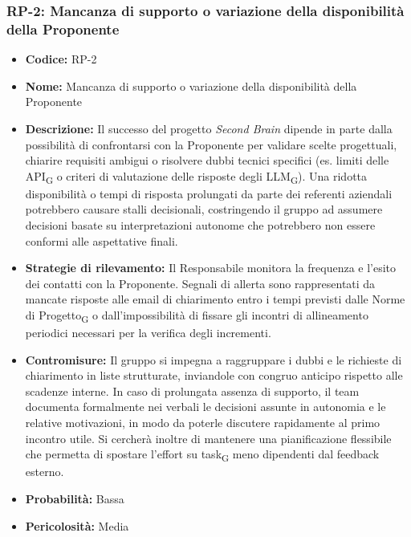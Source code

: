 \documentclass[a4paper, 10pt, colorlinks=true, linkcolor=black, urlcolor=blue, citecolor=blue, hidelinks]{article}
\begin{document}
\subsubsection{RP-2: Mancanza di supporto o variazione della disponibilità della Proponente}
\begin{itemize}
    \item \textbf{Codice:} RP-2
    \item \textbf{Nome:} Mancanza di supporto o variazione della disponibilità della Proponente

    \item \textbf{Descrizione:} Il successo del progetto \textit{Second Brain} dipende in parte dalla possibilità di confrontarsi con la Proponente per validare scelte progettuali, chiarire requisiti ambigui o risolvere dubbi tecnici specifici (es. limiti delle API\textsubscript{G} o criteri di valutazione delle risposte degli LLM\textsubscript{G}). Una ridotta disponibilità o tempi di risposta prolungati da parte dei referenti aziendali potrebbero causare stalli decisionali, costringendo il gruppo ad assumere decisioni basate su interpretazioni autonome che potrebbero non essere conformi alle aspettative finali.

    \item \textbf{Strategie di rilevamento:} Il Responsabile monitora la frequenza e l'esito dei contatti con la Proponente. Segnali di allerta sono rappresentati da mancate risposte alle email di chiarimento entro i tempi previsti dalle Norme di Progetto\textsubscript{G} o dall'impossibilità di fissare gli incontri di allineamento periodici necessari per la verifica degli incrementi.

    \item \textbf{Contromisure:} Il gruppo si impegna a raggruppare i dubbi e le richieste di chiarimento in liste strutturate, inviandole con congruo anticipo rispetto alle scadenze interne. In caso di prolungata assenza di supporto, il team documenta formalmente nei verbali le decisioni assunte in autonomia e le relative motivazioni, in modo da poterle discutere rapidamente al primo incontro utile. Si cercherà inoltre di mantenere una pianificazione flessibile che permetta di spostare l'effort su task\textsubscript{G} meno dipendenti dal feedback esterno.

    \item \textbf{Probabilità:} Bassa

    \item \textbf{Pericolosità:} Media
\end{itemize}
\end{document}
